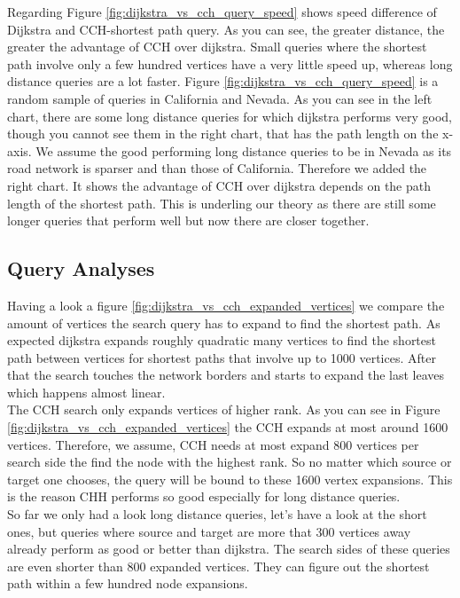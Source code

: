 Regarding Figure \ref{fig:dijkstra_vs_cch_query_speed} shows speed difference of Dijkstra and CCH-shortest path query. As you can see, the greater distance, the greater the advantage of CCH over dijkstra. Small queries where the shortest path involve only a few hundred vertices have a very little speed up,
whereas long distance queries are a lot faster. Figure \ref{fig:dijkstra_vs_cch_query_speed} is a random sample of queries in California and Nevada. As you can
see in the left chart, there are some long distance queries for which dijkstra performs very good, though you cannot see them in the right chart, that has the path 
length on the x-axis. We assume the good performing long distance queries to be in Nevada as its road network is sparser and than those of California. Therefore we added the right chart.
It shows the advantage of CCH over dijkstra depends on the path length of the shortest path. This is underling our theory as there are still some longer queries that perform well but now there are closer together.



\subsection{Query Analyses}

Having a look a figure \ref{fig:dijkstra_vs_cch_expanded_vertices} we compare the amount of vertices the search query has to expand to find the shortest path. As expected dijkstra expands roughly quadratic many vertices to find the shortest path between vertices for shortest paths that involve up to 1000 vertices.
After that the search touches the network borders and starts to expand the last leaves which happens almost linear.\\
The CCH search only expands vertices of higher rank. As you can see in Figure \ref{fig:dijkstra_vs_cch_expanded_vertices} the CCH expands at most around 1600 vertices. Therefore, we assume, CCH needs at most expand 800 vertices per search side the find the node with the highest rank. So no matter which source or target one chooses, the query will be bound to these 1600 vertex expansions.
This is the reason CHH performs so good especially for long distance queries.
\\
So far we only had a look long distance queries, let's have a look at the short ones, but queries where source and target are more that 300 vertices away already perform as good or better than dijkstra. The search sides of these queries are even shorter than 800 expanded vertices. They can figure out the shortest path within a few hundred node expansions.

